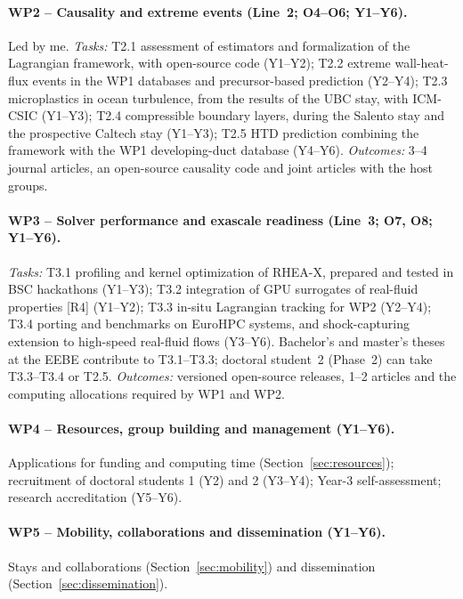 \documentclass[11pt]{article}
\begin{document}
\paragraph{WP2 -- Causality and extreme events (Line~2; O4--O6; Y1--Y6).} Led by me.
\emph{Tasks:} T2.1 assessment of estimators and formalization of the Lagrangian framework,
with open-source code (Y1--Y2); T2.2 extreme wall-heat-flux events in the WP1 databases and
precursor-based prediction (Y2--Y4); T2.3 microplastics in ocean turbulence, from the results
of the UBC stay, with ICM-CSIC (Y1--Y3); T2.4 compressible boundary layers, during the
Salento stay and the prospective Caltech stay (Y1--Y3); T2.5 HTD prediction combining the
framework with the WP1 developing-duct database (Y4--Y6).
\emph{Outcomes:} 3--4 journal articles, an open-source causality code and joint articles with
the host groups.

\paragraph{WP3 -- Solver performance and exascale readiness (Line~3; O7, O8; Y1--Y6).}
\emph{Tasks:} T3.1 profiling and kernel optimization of RHEA-X, prepared and tested in BSC
hackathons (Y1--Y3); T3.2 integration of GPU surrogates of real-fluid properties [R4] (Y1--Y2);
T3.3 in-situ Lagrangian tracking for WP2 (Y2--Y4); T3.4 porting and benchmarks on EuroHPC
systems, and shock-capturing extension to high-speed real-fluid flows (Y3--Y6). Bachelor's and master's theses at the EEBE contribute to T3.1--T3.3;
doctoral student~2 (Phase~2) can take T3.3--T3.4 or T2.5.
\emph{Outcomes:} versioned open-source releases, 1--2 articles and the computing allocations
required by WP1 and WP2.

\paragraph{WP4 -- Resources, group building and management (Y1--Y6).} Applications for
funding and computing time (Section~\ref{sec:resources}); recruitment of doctoral students
1 (Y2) and 2 (Y3--Y4); Year-3 self-assessment; research accreditation (Y5--Y6).

\paragraph{WP5 -- Mobility, collaborations and dissemination (Y1--Y6).} Stays and
collaborations (Section~\ref{sec:mobility}) and dissemination
(Section~\ref{sec:dissemination}).
\end{document}
